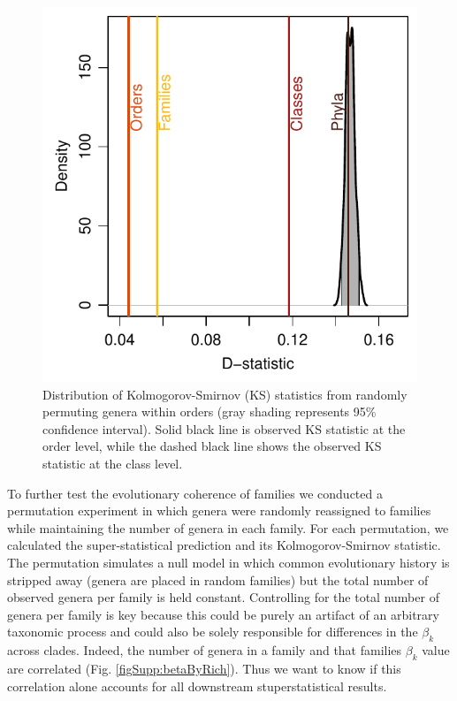 \documentclass[12pt]{article}
\let\citep=\cite
\begin{document}
\begin{figure}[!h]
  \centering
  \includegraphics[scale=1]{../../fig_dStat.pdf}
  \caption[Goodness of super-statistical theory fit]{Distribution of
    Kolmogorov-Smirnov (KS) statistics from randomly permuting genera
    within orders (gray shading represents 95\% confidence
    interval). Solid black line is observed KS statistic at the order
    level, while the dashed black line shows the observed KS statistic
    at the class level.}
  \label{fig:dStat}
\end{figure}

To further test the evolutionary coherence of families we conducted a
permutation experiment in which genera were randomly reassigned to
families while maintaining the number of genera in each family. For
each permutation, we calculated the super-statistical prediction and
its Kolmogorov-Smirnov statistic. The permutation simulates a null
model in which common evolutionary history is stripped away (genera
are placed in random families) but the total number of observed genera
per family is held constant. Controlling for the total number of
genera per family is key because this could be purely an artifact of
an arbitrary taxonomic process \citep{yule1925, berlin1966, hey2001,
  capocci2008} and could also be solely responsible for differences in
the $\beta_k$ across clades. Indeed, the number of genera in a family
and that families $\beta_k$ value are correlated
(Fig. \ref{figSupp:betaByRich}). Thus we want to know if this
correlation alone accounts for all downstream stuperstatistical
results.
\end{document}
